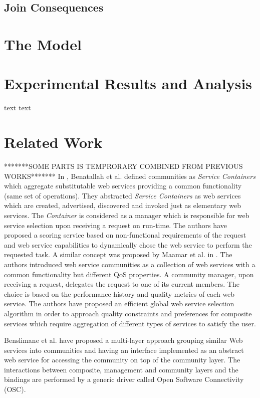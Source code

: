 \documentclass[10pt,journal,cspaper,compsoc]{IEEEtran}
\begin{document}
\subsection{Join Consequences}\label{s:jc}

\section{The Model}\label{s:model}

\section{Experimental Results and Analysis}\label{s:resutls}

text text \cite{ICWS2011-1}

\section{Related Work}\label{s:related_work}

*******SOME PARTS IS TEMPRORARY COMBINED FROM PREVIOUS WORKS*******
In \cite{DBLP:journals/internet/BenatallahSD03}, Benatallah et al.
defined communities as \emph{Service Containers} which aggregate
substitutable web services providing a common functionality (same
set of operations). They abstracted \emph{Service Containers} as
web services which are created, advertised, discovered and invoked
just as elementary web services. The \emph{Container} is
considered as a manager which is responsible for web service
selection upon receiving a request on run-time. The authors have
proposed a scoring service based on non-functional requirements of
the request and web service capabilities to dynamically chose the
web service to perform the requested task. A similar concept was
proposed by Maamar et al. in
\cite{DBLP:journals/ijebr/MaamarSTBB09}. The authors introduced
web service communities as a collection of web services with a
common functionality but different QoS properties. A community
manager, upon receiving a request, delegates the request to one of
its current members. The choice is based on the performance
history and quality metrics of each web service. The authors have
proposed an efficient global web service selection algorithm in
order to approach quality constraints and preferences for
composite services which require aggregation of different types of
services to satisfy the user.

Benslimane et al. \cite{Liris-2770} have proposed a multi-layer
approach grouping similar Web services into communities and having
an interface implemented as an abstract web service for accessing
the community on top of the community layer. The interactions
between composite, management and community layers and the
bindings are performed by a generic driver called Open Software
Connectivity (OSC).
\end{document}

